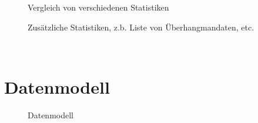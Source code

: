 \documentclass[11pt,a4paper]{scrartcl}
\begin{document}
\begin{figure}[h!]
    \begin{center}
    \end{center}
    \caption{Vergleich von verschiedenen Statistiken}
    \label{fig:gui-vergleich}
\end{figure}
\begin{figure}[h!]
    \begin{center}
    \end{center}
    \caption{Zusätzliche Statistiken, z.b. Liste von Überhangmandaten, etc.}
    \label{fig:gui-zusatzstatistiken}
\end{figure}

$ $\newpage
$ $\newpage
\section{Datenmodell}
\begin{figure}[h!]
    \begin{center}
    \end{center}
    \caption{Datenmodell}
    \label{fig:datenmodell}
\end{figure}
\end{document}

